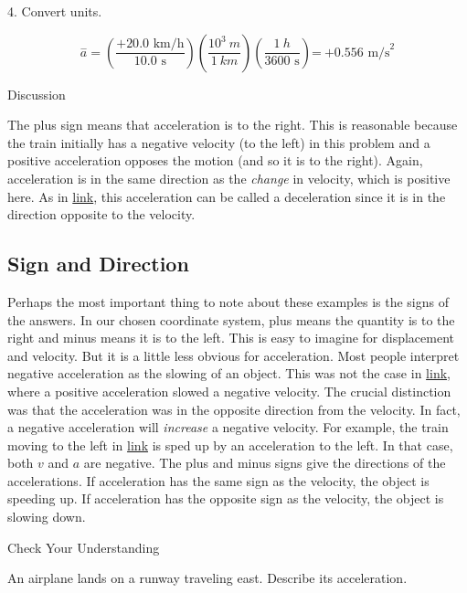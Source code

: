 \documentclass[
]{book}
\begin{document}
4. Convert units.

\leavevmode{}%
\[{\overset{-}{a} = \left( \frac{{+ \text{20}}\text{.}\text{0\ km/h}}{\text{10}\text{.}\text{0\ s}} \right)}\left( \frac{\text{10}^{3}\ m}{1\ km} \right)\left( \frac{1\ h}{\text{3600\ s}} \right)\text{=}\ \text{+}0\text{.556\ m}\text{/s}^{2}\]

{Discussion}

The plus sign means that acceleration is to the right. This is
reasonable because the train initially has a negative velocity (to the
left) in this problem and a positive acceleration opposes the motion
(and so it is to the right). Again, acceleration is in the same
direction as the \emph{change} in velocity, which is positive here. As in
\protect\hyperlink{fs-id3600466}{link}, this acceleration can be
called a deceleration since it is in the direction opposite to the
velocity.

\hypertarget{fs-id1810991}{}
\hypertarget{sign-and-direction}{%
\subsection{Sign and Direction}\label{sign-and-direction}}

Perhaps the most important thing to note about these examples is the
signs of the answers. In our chosen coordinate system, plus means the
quantity is to the right and minus means it is to the left. This is easy
to imagine for displacement and velocity. But it is a little less
obvious for acceleration. Most people interpret negative acceleration as
the slowing of an object. This was not the case in
\protect\hyperlink{fs-id4015260}{link}, where a positive
acceleration slowed a negative velocity. The crucial distinction was
that the acceleration was in the opposite direction from the velocity.
In fact, a negative acceleration will \emph{increase} a negative velocity.
For example, the train moving to the left in
\protect\hyperlink{import-auto-id2412190}{link} is sped up by an
acceleration to the left. In that case, both \(v{}\) and \(a{}\) are
negative. The plus and minus signs give the directions of the
accelerations. If acceleration has the same sign as the velocity, the
object is speeding up. If acceleration has the opposite sign as the
velocity, the object is slowing down.

\hypertarget{fs-id4121834}{}
Check Your Understanding

\leavevmode{}%
An airplane lands on a runway traveling east. Describe its acceleration.
\end{document}
